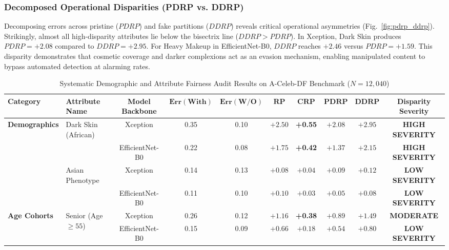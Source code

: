 \documentclass[journal]{IEEEtran}
\begin{document}
\subsubsection{Decomposed Operational Disparities (PDRP vs. DDRP)}
Decomposing errors across pristine ($PDRP$) and fake partitions ($DDRP$) reveals critical operational asymmetries (Fig.~\ref{fig:pdrp_ddrp}). Strikingly, almost all high-disparity attributes lie below the bisectrix line ($DDRP > PDRP$). In Xception, Dark Skin produces $PDRP = +2.08$ compared to $DDRP = +2.95$. For Heavy Makeup in EfficientNet-B0, $DDRP$ reaches $+2.46$ versus $PDRP = +1.59$. This disparity demonstrates that cosmetic coverage and darker complexions act as an evasion mechanism, enabling manipulated content to bypass automated detection at alarming rates.

\begin{table}[t]
\caption{Systematic Demographic and Attribute Fairness Audit Results on A-Celeb-DF Benchmark ($N = 12{,}040$)}
\label{tab:full_audit}
\centering
\small
\renewcommand{\arraystretch}{1.2}
\begin{tabular*}{\textwidth}{@{\extracolsep{\fill}}llcccccccc}
\toprule
\textbf{Category} & \textbf{Attribute Name} & \textbf{Model Backbone} & $\mathbf{Err(With)}$ & $\mathbf{Err(W/O)}$ & $\mathbf{RP}$ & $\mathbf{CRP}$ & $\mathbf{PDRP}$ & $\mathbf{DDRP}$ & \textbf{Disparity Severity} \\
\midrule
\multirow{4}{*}{\textbf{Demographics}} 
 & \multirow{2}{*}{Dark Skin (African)} & Xception & 0.35 & 0.10 & $+2.50$ & \textbf{+0.55} & $+2.08$ & $+2.95$ & \textcolor{sevhigh}{\textbf{HIGH SEVERITY}} \\
 & & EfficientNet-B0 & 0.22 & 0.08 & $+1.75$ & \textbf{+0.42} & $+1.37$ & $+2.15$ & \textcolor{sevhigh}{\textbf{HIGH SEVERITY}} \\
\cmidrule{2-10}
 & \multirow{2}{*}{Asian Phenotype} & Xception & 0.14 & 0.13 & $+0.08$ & $+0.04$ & $+0.09$ & $+0.12$ & \textcolor{sevlow}{\textbf{LOW SEVERITY}} \\
 & & EfficientNet-B0 & 0.11 & 0.10 & $+0.10$ & $+0.03$ & $+0.05$ & $+0.08$ & \textcolor{sevlow}{\textbf{LOW SEVERITY}} \\
\midrule
\multirow{4}{*}{\textbf{Age Cohorts}} 
 & \multirow{2}{*}{Senior (Age $\ge 55$)} & Xception & 0.26 & 0.12 & $+1.16$ & \textbf{+0.38} & $+0.89$ & $+1.49$ & \textcolor{sevmod}{\textbf{MODERATE}} \\
 & & EfficientNet-B0 & 0.15 & 0.09 & $+0.66$ & $+0.18$ & $+0.54$ & $+0.80$ & \textcolor{sevlow}{\textbf{LOW SEVERITY}} \\

\end{tabular*}
\end{table}
\end{document}
